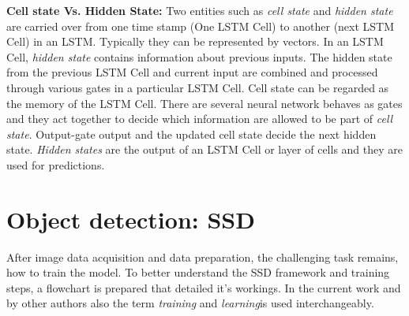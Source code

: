 \textbf{Cell state Vs. Hidden State:}
Two entities such as \textit{cell state} and \textit{hidden state} are carried over from one time stamp (One LSTM Cell) to another (next LSTM Cell) in an LSTM. Typically they can be represented by vectors. In an LSTM Cell, \textit{hidden state }contains information about previous inputs. The hidden state from the previous LSTM Cell and current input are combined and processed through various gates in a particular LSTM Cell. Cell state can be regarded as the memory of the LSTM Cell. There are several neural network behaves as gates and they act together to decide which information are allowed to be part of \textit{cell state}. Output-gate output and the updated cell state decide the next hidden state. \textit{Hidden states} are the output of an LSTM Cell or layer of cells and they are used for predictions.  

\section{Object detection: SSD}
After image data acquisition and data preparation, the challenging task remains, how to train the model. 
To better understand the SSD framework and training steps, a flowchart is prepared that detailed it's workings. In the current work and by other authors also the term \textit{training }and \textit{learning}is used interchangeably. 

